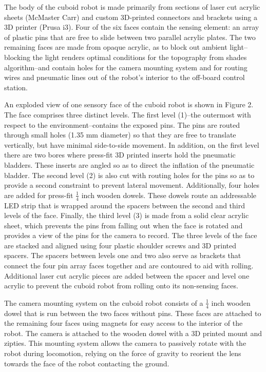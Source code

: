 \documentclass[letterpaper, 12 pt, conference]{ieeeconf}  %
\begin{document}
The body of the cuboid robot is made primarily from sections of laser cut acrylic sheets (McMaster Carr) and custom 3D-printed connectors and brackets using a 3D printer (Prusa i3). Four of the six faces contain the sensing element: an array of plastic pins that are free to slide between two parallel acrylic plates. The two remaining faces are made from opaque acrylic, as to block out ambient light--blocking the light renders optimal conditions for the topography from shades algorithm--and contain holes for the camera mounting system and for routing wires and pneumatic lines out of the robot's interior to the off-board control station. 

An exploded view of one sensory face of the cuboid robot is shown in Figure 2. The face comprises three distinct levels. The first level (1)--the outermost with respect to the environment--contains the exposed pins. The pins are routed through small holes (1.35 mm diameter) so that they are free to translate vertically, but have minimal side-to-side movement. In addition, on the first level there are two bores where press-fit 3D printed inserts hold the pneumatic bladders. These inserts are angled so as to direct the inflation of the pneumatic bladder. The second level (2) is also cut with routing holes for the pins so as to provide a second constraint to prevent lateral movement. Additionally, four holes are added for press-fit \( \frac{1}{4} \) inch wooden dowels. These dowels route an addressable LED strip that is wrapped around the spacers between the second and third levels of the face. Finally, the third level (3) is made from a solid clear acrylic sheet, which prevents the pins from falling out when the face is rotated and provides a view of the pins for the camera to record. The three levels of the face are stacked and aligned using four plastic shoulder screws and 3D printed spacers. The spacers between levels one and two also serve as brackets that connect the four pin array faces together and are contoured to aid with rolling. Additional laser cut acrylic pieces are added between the spacer and level one acrylic to prevent the cuboid robot from rolling onto its non-sensing faces.

The camera mounting system on the cuboid robot consists of a \( \frac{1}{4} \) inch wooden dowel that is run between the two faces without pins. These faces are attached to the remaining four faces using magnets for easy access to the interior of the robot. The camera is attached to the wooden dowel with a 3D printed mount and zipties. This mounting system allows the camera to passively rotate with the robot during locomotion, relying on the force of gravity to reorient the lens towards the face of the robot contacting the ground. 
\end{document}

